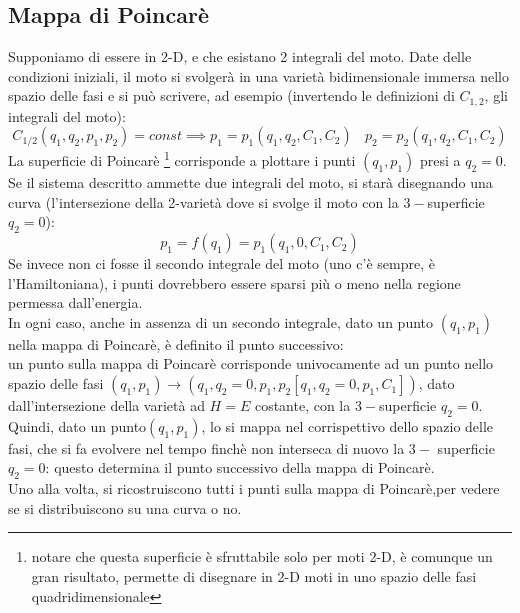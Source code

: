 \documentclass[a4paper,12pt]{article}
\theoremstyle{plain}
\theoremstyle{definition}
\newcommand{\ra}{\rightarrow}
\theoremstyle{remark}
\begin{document}
\subsection{Mappa di Poincarè}
Supponiamo di essere in 2-D, e che esistano 2 integrali del moto. Date delle condizioni iniziali, il moto si svolgerà in una varietà bidimensionale immersa nello spazio delle fasi e si può scrivere, ad esempio (invertendo le definizioni di $C_{1,2}$, gli integrali del moto):
\[C_{1/2}(q_1,q_2,p_1,p_2)=const\implies p_1=p_1(q_1,q_2,C_1,C_2)\:\:\:\:p_2=p_2(q_1,q_2,C_1,C_2)\]
La superficie di Poincarè \footnote{notare che questa superficie è sfruttabile solo per moti 2-D, è comunque un gran risultato, permette di disegnare in 2-D moti in uno spazio delle fasi quadridimensionale} corrisponde a plottare i punti $(q_1,p_1)$ presi a $q_2=0$. Se il sistema descritto ammette due integrali del moto, si starà disegnando una curva (l'intersezione della 2-varietà dove si svolge il moto con la $3-$superficie $q_2=0$):
\[p_1=f(q_1)=p_1(q_1,0,C_1,C_2)\]
Se invece non ci fosse il secondo integrale del moto (uno c'è sempre, è l'Hamiltoniana), i punti dovrebbero essere sparsi più o meno nella regione permessa dall'energia.
\\ In ogni caso, anche in assenza di un secondo integrale, dato un punto $(q_1,p_1)$ nella mappa di Poincarè, è  definito il punto successivo:\\un punto sulla mappa di Poincarè corrisponde univocamente ad un punto nello spazio delle fasi $(q_1,p_1)\ra(q_1,q_2=0,p_1,p_2[q_1,q_2=0,p_1,C_1])$, dato dall'intersezione della varietà ad $H=E$ costante, con la $3-$superficie $q_2=0$.\\ Quindi, dato un punto$ (q_1,p_1)$, lo si mappa nel corrispettivo dello spazio delle fasi, che si fa evolvere nel tempo finchè non interseca di nuovo la $3-$ superficie $q_2=0$: questo determina il punto successivo della mappa di Poincarè.\\Uno alla volta, si ricostruiscono tutti i punti sulla mappa di Poincarè,per vedere se si distribuiscono su una curva o no.
\end{document}
